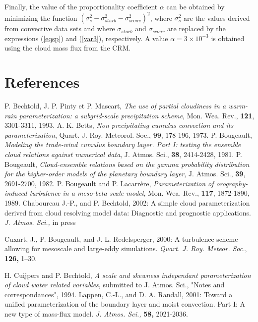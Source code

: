 Finally, the  value of the proportionality coefficient $\alpha$ can be obtained by minimizing the function
$(\sigma_s^2-\sigma_{s  turb}^2-\sigma_{s  conv}^2)^2$, where $\sigma_s^2$ are the  values
derived from convective data sets
and where $\sigma_{s turb}$ and $\sigma_{s conv}$ are replaced by
the expressions (\ref{eqsp}) and (\ref{var3}), respectively.  A value $\alpha=3\times 10^{-3}$ is obtained
using the cloud mass flux from the CRM.




\section{References}

\por   P. { Bechtold}, J. P. { Pinty} et P. { Mascart},
           {\it The use of partial cloudiness in a warm-rain parameterization:
            a subgrid-scale precipitation scheme},
           Mon. Wea. Rev., {\bf 121}, 3301-3311, 1993.
\por  A. K. { Betts},
           {\it Non precipitating cumulus convection and its parameterization},
           Quart. J. Roy. Meteorol. Soc., {\bf 99}, 178-196, 1973.
\por  P. { Bougeault},
           {\it Modeling the trade-wind cumulus boundary layer.  Part I:
                testing the ensemble cloud relations against numerical data},
           J. Atmos. Sci., {\bf 38}, 2414-2428, 1981.
\por    P. { Bougeault},
           {\it Cloud-ensemble relations based on the gamma probability
           distribution for the higher-order models of the planetary
           boundary layer},
           J. Atmos. Sci., {\bf 39}, 2691-2700, 1982.
\por   P. { Bougeault} and P. { Lacarr\`ere},
           {\it Parameterization of orography-induced turbulence in a
                 meso-beta scale model},
           Mon. Wea. Rev., {\bf 117}, 1872-1890, 1989.
\por
Chaboureau J.-P., and P. Bechtold, 2002: A simple cloud parameterization derived from
cloud resolving model data: Diagnostic and prognostic applications.
{\it J. Atmos. Sci.,} in press

\por
Cuxart, J., P. Bougeault, and J.-L. Redelsperger, 2000:
A turbulence scheme allowing for mesoscale and large-eddy simulations.
{\it Quart. J. Roy. Meteor. Soc.}, {\bf 126,} 1--30.

\por   H. { Cuijpers} and P. { Bechtold},
           {\it A scale and skewness independant parameterization of
                cloud water related variables},
           submitted to J. Atmos. Sci., "Notes and correspondances", 1994.
\por
Lappen, C.-L., and D. A. Randall, 2001: Toward a unified parameterization of
the boundary layer and moist convection. Part I: A new type of mass-flux model.
{\it J. Atmos. Sci.,} {\bf 58,} 2021-2036.

